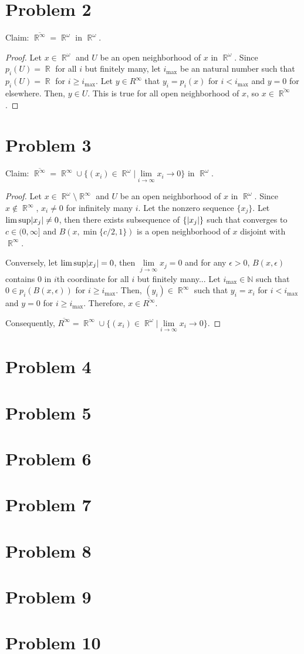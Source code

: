 \documentclass{article}
\DeclareMathOperator{\rr}{\mathbb{R}}
\DeclarePairedDelimiter\abs{\lvert}{\rvert}%
\begin{document}
\section*{Problem 2}
Claim: $\overline{\rr^\infty}=\rr^\omega$ in $\rr^\omega$.
\begin{proof}
Let $x\in \rr^\omega$ and $U$ be an open neighborhood of $x$ in $\rr^\omega$. Since $p_i(U)=\rr$ for all $i$ but finitely many, let 
$i_{\max}$ be an natural number such that $p_i(U)= \rr$ for $i\geq i_{\max}$. Let $y\in R^\infty$ that $y_i=p_i(x)$ for $i<i_{\max}$ and 
$y=0$ for elsewhere. Then, $y\in U$. This is true for all open neighborhood of $x$, so $x\in \overline{\rr^\infty}$.
\end{proof}
\section*{Problem 3}
Claim: $\overline{\rr^\infty}=\rr^\infty \cup \{(x_i)\in \rr^\omega|\lim\limits_{i\rightarrow \infty}x_i\rightarrow 0\}$ in $\rr^\omega$.
\begin{proof}
Let $x\in \rr^\omega\setminus \rr^\infty$ and $U$ be an open neighborhood of $x$ in $\rr^\omega$. Since $x\notin \rr^\infty$, $x_i\neq 0$ 
for infinitely many $i$. Let the nonzero sequence $\{x_j\}$. Let $\lim\sup \abs{x_j}\neq 0$, then there exists subsequence of $\{\abs{x_j}\}$
 such that converges to $c\in (0,\infty]$ and $B(x, \min\{c/2, 1\})$ is a open neighborhood of $x$ disjoint with $\rr^\infty$.

Conversely, let $\lim\sup \abs{x_j}= 0$, then $\lim\limits_{j\rightarrow \infty} x_j= 0$ and for any $\epsilon>0$, $B(x, \epsilon)$ contains $0$ in $i$th coordinate for all $i$ but finitely many... Let $i_{\max}\in \mathbb{N}$ such that $0\in p_i(B(x, \epsilon))$ for $i\geq i_{\max}$. Then, $(y_i)\in \rr^\infty$ such that $y_i=x_i$ for $i< i_{\max}$ and $y=0$ for $i\geq i_{\max}$. Therefore, $x\in \overline{R^\infty}$.

Consequently, $\overline{R^\infty}=\rr^\infty \cup \{(x_i)\in \rr^\omega|\lim\limits_{i\rightarrow \infty}x_i\rightarrow 0\}$.
\end{proof}
\section*{Problem 4}

\section*{Problem 5}
\section*{Problem 6}
\section*{Problem 7}
\section*{Problem 8}
\section*{Problem 9}
\section*{Problem 10}
\end{document}
